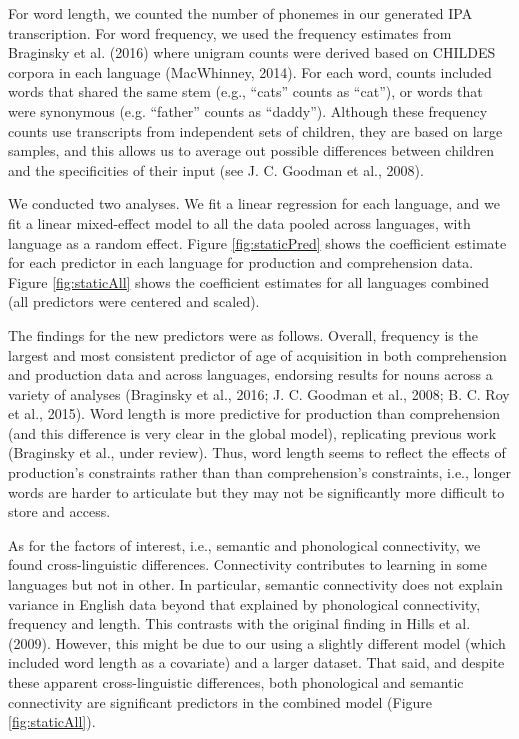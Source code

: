 \documentclass[english,floatsintext,man]{apa6}
\theoremstyle{definition}
\theoremstyle{definition}
\theoremstyle{definition}
\theoremstyle{remark}
\begin{document}
For word length, we counted the number of phonemes in our generated IPA
transcription. For word frequency, we used the frequency estimates from
Braginsky et al. (2016) where unigram counts were derived based on
CHILDES corpora in each language (MacWhinney, 2014). For each word,
counts included words that shared the same stem (e.g., \enquote{cats}
counts as \enquote{cat}), or words that were synonymous (e.g.
\enquote{father} counts as \enquote{daddy}). Although these frequency
counts use transcripts from independent sets of children, they are based
on large samples, and this allows us to average out possible differences
between children and the specificities of their input (see J. C. Goodman
et al., 2008).

We conducted two analyses. We fit a linear regression for each language,
and we fit a linear mixed-effect model to all the data pooled across
languages, with language as a random effect. Figure \ref{fig:staticPred}
shows the coefficient estimate for each predictor in each language for
production and comprehension data. Figure \ref{fig:staticAll} shows the
coefficient estimates for all languages combined (all predictors were
centered and scaled).

The findings for the new predictors were as follows. Overall, frequency
is the largest and most consistent predictor of age of acquisition in
both comprehension and production data and across languages, endorsing
results for nouns across a variety of analyses (Braginsky et al., 2016;
J. C. Goodman et al., 2008; B. C. Roy et al., 2015). Word length is more
predictive for production than comprehension (and this difference is
very clear in the global model), replicating previous work (Braginsky et
al., under review). Thus, word length seems to reflect the effects of
production's constraints rather than than comprehension's constraints,
i.e., longer words are harder to articulate but they may not be
significantly more difficult to store and access.

As for the factors of interest, i.e., semantic and phonological
connectivity, we found cross-linguistic differences. Connectivity
contributes to learning in some languages but not in other. In
particular, semantic connectivity does not explain variance in English
data beyond that explained by phonological connectivity, frequency and
length. This contrasts with the original finding in Hills et al. (2009).
However, this might be due to our using a slightly different model
(which included word length as a covariate) and a larger dataset. That
said, and despite these apparent cross-linguistic differences, both
phonological and semantic connectivity are significant predictors in the
combined model (Figure \ref{fig:staticAll}).
\end{document}
